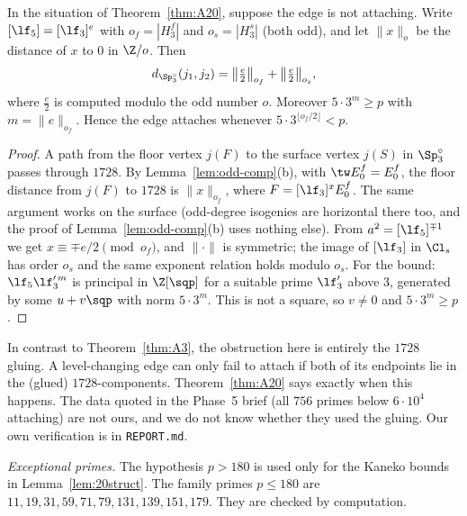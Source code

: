 \begin{theorem}\label{thm:C20}
In the situation of Theorem~\ref{thm:A20}, suppose the edge is not attaching.  Write
$[\lf_5]=[\lf_3]^{e}$ with $o_f=|H_3^f|$ and $o_s=|H_3^s|$ (both odd), and let $\|x\|_o$ be the
distance of $x$ to $0$ in $\Z/o$.  Then
\[d_{\Sp^\circ_3}(j_1,j_2)=\bigl\|\tfrac e2\bigr\|_{o_f}+\bigl\|\tfrac e2\bigr\|_{o_s},\]
where $\frac e2$ is computed modulo the odd number $o$.  Moreover $5\cdot3^{m}\ge p$ with
$m=\|e\|_{o_f}$.  Hence the edge attaches whenever $5\cdot3^{\lfloor o_f/2\rfloor}<p$.
\end{theorem}
\begin{proof}
A path from the floor vertex $j(F)$ to the surface vertex $j(S)$ in $\Sp^\circ_3$ passes through
$1728$.  By Lemma~\ref{lem:odd-comp}(b), with $\tw E_0^f=E_0^f$, the floor distance from $j(F)$ to
$1728$ is $\|x\|_{o_f}$, where $F=[\lf_3]^{x}E_0^f$.  The same argument works on the surface
(odd-degree isogenies are horizontal there too, and the proof of Lemma~\ref{lem:odd-comp}(b)
uses nothing else).  From $a^2=[\lf_5]^{\mp1}$ we get $x\equiv\mp e/2\pmod{o_f}$, and
$\|\cdot\|$ is symmetric; the image of $[\lf_3]$ in $\Cl_s$ has order $o_s$ and the same exponent
relation holds modulo $o_s$.  For the bound: $\lf_5\lf_3'^{\,m}$ is principal in $\Z[\sqp]$ for a
suitable prime $\lf_3'$ above $3$, generated by some $u+v\sqp$ with norm $5\cdot3^m$.  This is not
a square, so $v\neq0$ and $5\cdot3^m\ge p$.
\end{proof}

\begin{remark}
In contrast to Theorem~\ref{thm:A3}, the obstruction here is entirely the $1728$ gluing.  A
level-changing edge can only fail to attach if both of its endpoints lie in the (glued)
$1728$-components.  Theorem~\ref{thm:A20} says exactly when this happens.  The data quoted in the Phase~5 brief (all $756$
primes below $6\cdot10^4$ attaching) are not ours, and we do not know whether they used the gluing.
Our own verification is in \texttt{REPORT.md}.
\end{remark}

\emph{Exceptional primes.}  The hypothesis $p>180$ is used only for the Kaneko bounds in
Lemma~\ref{lem:20struct}.  The family primes $p\le180$ are
$11,19,31,59,71,79,131,139,151,179$.  They are checked by computation.
